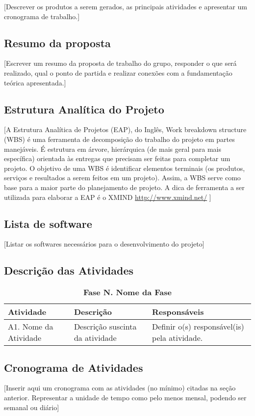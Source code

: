 
[Descrever os produtos a serem gerados, as principais atividades e apresentar um cronograma de trabalho.]


\subsection{Resumo da proposta} %
\label{sub:resumo_da_proposta}

[Escrever um resumo da proposta de trabalho do grupo, responder o que será realizado, qual o ponto de partida e realizar conexões com a fundamentação teórica apresentada.]

\subsection{Estrutura Analítica do Projeto} %
\label{sub:estrutura_anal_tica_do_projeto}

[A Estrutura Analítica de Projetos (EAP), do Inglês, Work breakdown structure (WBS) é uma ferramenta de decomposição do trabalho do projeto em partes manejáveis. É estrutura em árvore, hierárquica (de mais geral para mais específica) orientada às entregas que precisam ser feitas para completar um projeto.
O objetivo de uma WBS é identificar elementos terminais (os produtos, serviços e resultados a serem feitos em um projeto). Assim, a WBS serve como base para a maior parte do planejamento de projeto.
A dica de ferramenta a ser utilizada para elaborar a EAP é o XMIND 
\url{http://www.xmind.net/} ]


\subsection{Lista de software} %
\label{sub:lista_de_software}

[Listar os softwares necessários para o desenvolvimento do projeto]


\subsection{Descrição das Atividades} %
\label{sub:descri_o_das_atividades}

\begin{table}[htbp]
\caption{\textbf{Fase N. Nome da Fase}}
\begin{tabular}{|l|l|l|}
\hline
\textbf{Atividade} & \textbf{Descrição} & \textbf{Responsáveis} \\ \hline
A1. Nome da Atividade & Descrição suscinta da atividade & Definir o(s) responsável(is) pela atividade. \\ \hline
\end{tabular}
\label{}
\end{table}


\subsection{Cronograma de Atividades} %
\label{sub:cronograma_de_atividades}

[Inserir aqui um cronograma com as atividades (no mínimo) citadas na seção anterior. Representar a unidade de tempo como pelo menos mensal, podendo ser semanal ou diário]